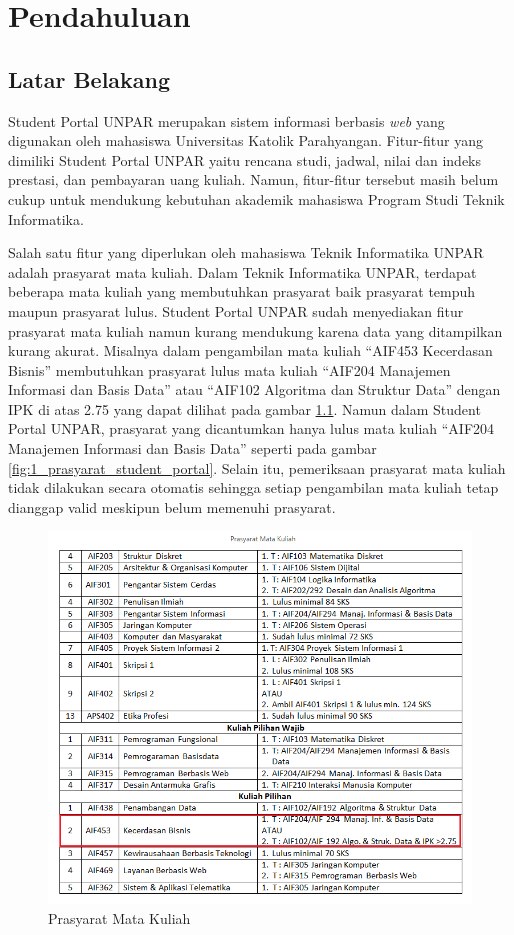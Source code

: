 \chapter{Pendahuluan}
\label{chap:pendahuluan}

\section{Latar Belakang}
\label{sec:latar_belakang}

Student Portal UNPAR\cite{studentportalunpar} merupakan sistem informasi berbasis \textit{web} yang digunakan oleh mahasiswa Universitas Katolik Parahyangan. Fitur-fitur yang dimiliki Student Portal UNPAR yaitu rencana studi, jadwal, nilai dan indeks prestasi, dan pembayaran uang kuliah. Namun, fitur-fitur tersebut masih belum cukup untuk mendukung kebutuhan akademik mahasiswa Program Studi Teknik Informatika. 

Salah satu fitur yang diperlukan oleh mahasiswa Teknik Informatika UNPAR adalah prasyarat mata kuliah. Dalam Teknik Informatika UNPAR, terdapat beberapa mata kuliah yang membutuhkan prasyarat baik prasyarat tempuh maupun prasyarat lulus. Student Portal UNPAR sudah menyediakan fitur prasyarat mata kuliah namun kurang mendukung karena data yang ditampilkan kurang akurat. Misalnya dalam pengambilan mata kuliah "`AIF453 Kecerdasan Bisnis"' membutuhkan prasyarat lulus mata kuliah "`AIF204 Manajemen Informasi dan Basis Data"' atau "`AIF102 Algoritma dan Struktur Data"' dengan IPK di atas 2.75 yang dapat dilihat pada gambar \ref{fig:1_prasyarat_tinyurl}. Namun dalam Student Portal UNPAR, prasyarat yang dicantumkan hanya lulus mata kuliah "`AIF204 Manajemen Informasi dan Basis Data"' seperti pada gambar \ref{fig:1_prasyarat_student_portal}. Selain itu, pemeriksaan prasyarat mata kuliah tidak dilakukan secara otomatis sehingga setiap pengambilan mata kuliah tetap dianggap valid meskipun belum memenuhi prasyarat.

\begin{figure}
	\centering
	\includegraphics[scale=0.5]{Gambar/contoh-tinyurl}
	\caption{Prasyarat Mata Kuliah} 
	\label{fig:1_prasyarat_tinyurl}
\end{figure}

